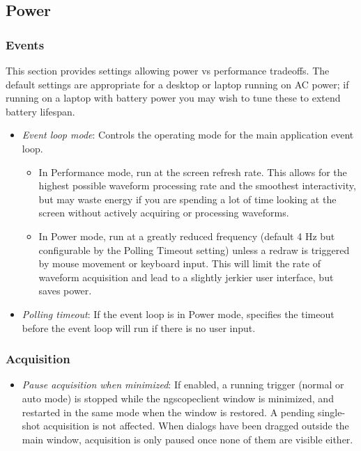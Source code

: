 \subsection{Power}

\subsubsection{Events}

This section provides settings allowing power vs performance tradeoffs. The default settings are appropriate for a
desktop or laptop running on AC power; if running on a laptop with battery power you may wish to tune these to extend
battery lifespan.

\begin{itemize}
\item \emph{Event loop mode}: Controls the operating mode for the main application event loop.
\begin{itemize}
\item In Performance mode, run at the screen refresh rate. This allows for the highest possible waveform processing rate
and the smoothest interactivity, but may waste energy if you are spending a lot of time looking at the screen without
actively acquiring or processing waveforms.
\item In Power mode, run at a greatly reduced frequency (default 4 Hz but configurable by the Polling Timeout setting)
unless a redraw is triggered by mouse movement or keyboard input. This will limit the rate of waveform acquisition and
lead to a slightly jerkier user interface, but saves power.
\end{itemize}
\item \emph{Polling timeout}: If the event loop is in Power mode, specifies the timeout before the event loop will run
if there is no user input.
\end{itemize}

\subsubsection{Acquisition}

\begin{itemize}
\item \emph{Pause acquisition when minimized}: If enabled, a running trigger (normal or auto mode) is stopped while the
ngscopeclient window is minimized, and restarted in the same mode when the window is restored. A pending single-shot
acquisition is not affected. When dialogs have been dragged outside the main window, acquisition is only paused once
none of them are visible either.
\end{itemize}

